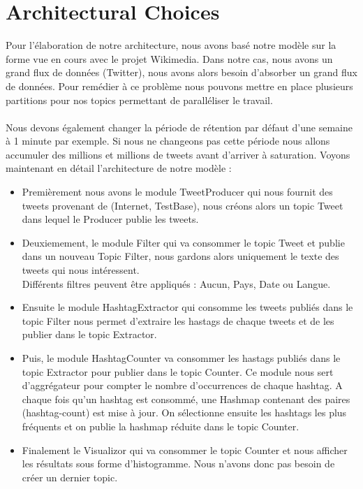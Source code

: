 \documentclass{article}
\begin{document}
\section{Architectural Choices}
Pour l'élaboration de notre architecture, nous avons basé notre modèle sur la forme vue en cours avec le projet Wikimedia. Dans notre cas, nous avons un grand flux de données (Twitter), nous avons alors besoin d'absorber un grand flux de données. Pour remédier à ce problème nous pouvons mettre en place plusieurs partitions pour nos topics permettant de paralléliser le travail. \\\\
Nous devons également changer la période de rétention par défaut d'une semaine à 1 minute par exemple. Si nous ne changeons pas cette période nous allons accumuler des millions et millions de tweets avant d'arriver à saturation. Voyons maintenant en détail l'architecture de notre modèle : \\
\begin{itemize}
    \item Premièrement nous avons le module TweetProducer qui nous fournit des tweets provenant de (Internet, TestBase), nous créons alors un topic Tweet dans lequel le Producer publie les tweets.\\
    \item Deuxiemement, le module Filter qui va consommer le topic Tweet et publie dans un nouveau Topic Filter, nous gardons alors uniquement le texte des tweets qui nous intéressent. \\
    Différents filtres peuvent être appliqués : Aucun, Pays, Date ou Langue.\\
    \item Ensuite le module HashtagExtractor qui consomme les tweets publiés dans le topic Filter nous permet d'extraire les hastags de chaque tweets et de les publier dans le topic Extractor.\\
    \item Puis, le module HashtagCounter va consommer les hastags publiés dans le topic Extractor pour publier dans le topic Counter. Ce module nous sert d'aggrégateur pour compter le nombre d'occurrences de chaque hashtag. A chaque fois qu'un hashtag est consommé, une Hashmap contenant des paires (hashtag-count) est mise à jour. On sélectionne ensuite les hashtags les plus fréquents et on publie la hashmap réduite dans le topic Counter.\\
    \item Finalement le Visualizor qui va consommer le topic Counter et nous afficher les résultats sous forme d'histogramme. Nous n'avons donc pas besoin de créer un dernier topic.

\end{itemize}
\maketitle
\end{document}
